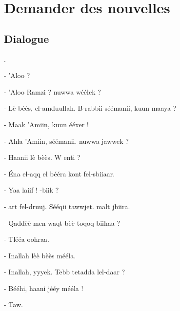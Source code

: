 \chapter{Demander des nouvelles}

\section{Dialogue}
.\newline

- 'Aloo ? 

- 'Aloo Ramzi ? \VS nuwwa \hb wéélek ?

- Lè bèès, el-\hb amduullah. B-rabbii sééma\hb nii, \vs kuun m\ca aaya ? 

- M\ca aak 'Amiin, \vs kuun ééxer !

- Ahla 'Amiin, sééma\hb nii. \VS nuwwa jawwek ?

- Haanii lè bèès. W enti ? 

- Éna el-\hb aqq el bééra\hb{} kont fel-sbii\ct aar. 

- Yaa la\ct iif ! \VS -biik ? 

- \CA\th art fel-druuj. Sééqii t\ca awwjet. \CA malt jbiira.

- Qaddèè\vs{} men waqt bèè\vs{} toq\ca oq biihaa ? 

- Tléé\th a o\vs ohraa.

- In\vs allah lèè bèès mééla. 

- In\vs allah, y\ca yy\vs ek. T\hb ebb tet\ca adda lel-daar ? 

- Bééhi, haani jééy mééla ! 

- T\vs aw. 